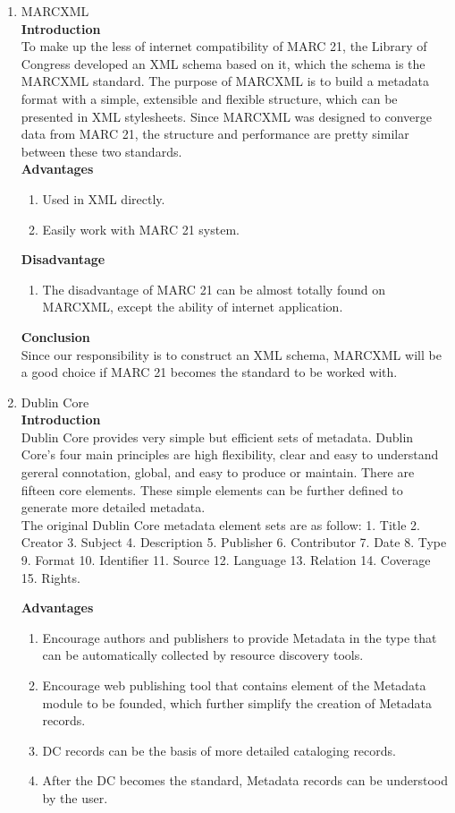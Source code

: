 \begin{enumerate}
	\item MARCXML\\
	{\bf Introduction}\\
	To make up the less of internet compatibility of MARC 21, the Library of Congress developed an XML schema based on it, which the schema is the MARCXML standard. 
	The purpose of MARCXML is to build a metadata format with a simple, extensible and flexible structure, which can be presented in XML stylesheets. 
	Since MARCXML was designed to converge data from MARC 21, the structure and performance are pretty similar between these two standards.\\
	
	{\bf Advantages}
	\begin{enumerate}
		\item Used in XML directly.
		\item Easily work with MARC 21 system.
	\end{enumerate}	
	{\bf Disadvantage}
	\begin{enumerate}
		\item The disadvantage of MARC 21 can be almost totally found on MARCXML, except the ability of internet application.
	\end{enumerate}
	{\bf Conclusion}\\
	Since our responsibility is to construct an XML schema, MARCXML will be a good choice if MARC 21 becomes the standard to be worked with.
	
	\item Dublin Core\\
	{\bf Introduction}\\
	Dublin Core provides very simple but efficient sets of metadata.
	Dublin Core’s four main principles are high flexibility, 
	clear and easy to understand gereral connotation, global, and easy to produce or maintain.	There are fifteen core elements.
	 These simple elements can be further defined to generate more detailed metadata.\\
	The original Dublin Core metadata element sets are as follow:
	1. Title 2. Creator 3. Subject 4. Description 5. Publisher 
	6. Contributor 7. Date 8. Type 9. Format 10. Identifier
	11. Source 12. Language 13. Relation 14. Coverage 15. Rights.
	\cite{NISO2012}
	
	{\bf Advantages}
	\begin{enumerate}
		\item Encourage authors and publishers to provide Metadata in the type that can be automatically collected by resource discovery tools.
		\item Encourage web publishing tool that contains element of the Metadata module to be founded, which further simplify the creation of Metadata records.
		\item DC records can be the basis of more detailed cataloging records.
		\item After the DC becomes the standard, Metadata records can be understood by the user.
	\end{enumerate}	
		

\end{enumerate}
